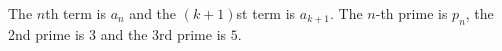 The $n$th term is $a_{n}$ and the $(k + 1)$st term is $a_{k + 1}$.
The $n$-th prime is $p_{n}$, the 2nd prime is $3$ and the 3rd prime is $5$.